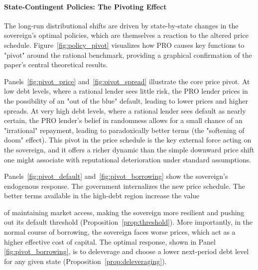 \documentclass[12pt]{article}
\theoremstyle{plain}
\begin{document}
\paragraph{State-Contingent Policies: The Pivoting Effect}
The long-run distributional shifts are driven by state-by-state changes in the
sovereign's optimal policies, which are themselves a reaction to the altered
price schedule. Figure~\ref{fig:policy_pivot} visualizes how PRO causes key
functions to "pivot" around the rational benchmark, providing a graphical
confirmation of the paper's central theoretical results.

Panels~\ref{fig:pivot_price} and~\ref{fig:pivot_spread} illustrate the core
price pivot. At low debt levels, where a rational lender sees little risk, the
PRO lender prices in the possibility of an "out of the blue" default, leading
to lower prices and higher spreads. At very high debt levels, where a rational
lender sees default as nearly certain, the PRO lender's belief in randomness
allows for a small chance of an "irrational" repayment, leading to
paradoxically better terms (the "softening of doom" effect). This pivot in the
price schedule is the key external force acting on the sovereign, and it offers
a richer dynamic than the simple downward price shift one might associate with
reputational deterioration under standard assumptions.

Panels~\ref{fig:pivot_default} and~\ref{fig:pivot_borrowing} show the
sovereign's endogenous response. The government internalizes the new price
schedule. The better terms available in the high-debt region increase the value

of maintaining market access, making the sovereign more resilient and pushing
out its default threshold (Proposition~\ref{prop:threshold}). More importantly,
in the normal course of borrowing, the sovereign faces worse prices, which act
as a higher effective cost of capital. The optimal response, shown in Panel
\ref{fig:pivot_borrowing}, is to deleverage and choose a lower next-period debt
level for any given state (Proposition~\ref{prop:deleveraging}).
\end{document}
